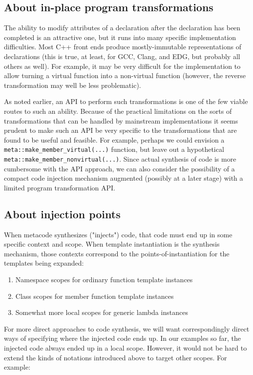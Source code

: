 \documentclass{wg21}
\newcommand{\cc}[1]{\texttt{#1}}
\begin{document}
\subsection{About in-place program transformations}
The ability to modify attributes of a declaration after the declaration has been
completed is an attractive one, but it runs into many specific implementation
difficulties. Most C++ front ends produce mostly-immutable representations of
declarations (this is true, at least, for GCC, Clang, and EDG, but probably all
others as well). For example, it may be very difficult for the implementation
to allow turning a virtual function into a non-virtual function (however, the
reverse transformation may well be less problematic).

As noted earlier, an API to perform such transformations is one of the few viable
routes to such an ability. Because of the practical limitations on the sorts of
transformations that can be handled by mainstream implementations it seems prudent
to make such an API be very specific to the transformations that are found to be
useful and feasible. For example, perhaps we could envision a \cc{meta::make_member_virtual(...)}
function, but leave out a hypothetical \cc{meta::make_member_nonvirtual(...)}.
Since actual synthesis of code is more cumbersome with the API approach, we can
also consider the possibility of a compact code injection mechanism augmented
(possibly at a later stage) with a limited program transformation API.

\subsection{About injection points}
When metacode synthesizes ("injects") code, that code must end up in some
specific context and scope. When template instantiation is the synthesis
mechanism, those contexts correspond to the points-of-instantiation for the
templates being expanded:

\begin{enumerate}
  \item Namespace scopes for ordinary function template instances
  \item Class scopes for member function template instances
  \item Somewhat more local scopes for generic lambda instances
\end{enumerate}

For more direct approaches to code synthesis, we will want correspondingly
direct ways of specifying where the injected code ends up. In our examples
so far, the injected code always ended up in a local scope. However, it would
not be hard to extend the kinds of notations introduced above to target other
scopes. For example:
\end{document}
